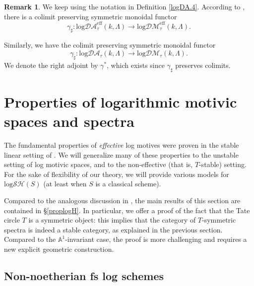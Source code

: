 \documentclass[11pt, a4paper]{amsart}
\theoremstyle{definition}
\newtheorem{rmk}[thm]{Remark}
\numberwithin{equation}{subsection}
\newcommand{\inflogSH}{\mathrm{log}\mathcal{SH}}
\newcommand{\inflogDA}{\mathrm{log}\mathcal{DA}}
\newcommand{\inflogDM}{\mathrm{log}\mathcal{DM}}
\begin{document}
\begin{rmk}
\label{logDA.5}
We keep using the notation in Definition \ref{logDA.4}.
According to \cite[\S 4.3]{logDM}, 
there is  a colimit preserving symmetric monoidal functor
\begin{equation}
\gamma_\sharp
\colon
\inflogDA_\tau^{\mathrm{eff}}(k,\Lambda)
\to
\inflogDM_\tau^{\mathrm{eff}}(k,\Lambda).
\end{equation}

Similarly, we have the colimit preserving symmetric monoidal functor
\begin{equation}
\label{logDA.5.2}
\gamma_\sharp
\colon
\inflogDA_\tau(k,\Lambda)
\to
\inflogDM_\tau(k,\Lambda).
\end{equation}
We denote the right adjoint by $\gamma^*$, 
which exists since $\gamma_\sharp$ preserves colimits.
\end{rmk}



\newpage





\section{Properties of logarithmic motivic spaces and spectra}
\label{polmsas}

The fundamental properties of \emph{effective} log motives were proven in the stable linear setting of \cite[\S 7]{logDM}.
We will generalize many of these properties to the unstable setting of log motivic spaces, and to the non-effective (that is, $T$-stable) setting. 
For the sake of flexibility of our theory, 
we will provide various models for $\inflogSH(S)$ (at least when $S$ is a classical scheme).

Compared to the analogous discussion in \cite{logDM}, the main results of this section are contained in \S \ref{proplogH}. In particular, we offer a proof of the fact that the Tate circle $T$ is a symmetric object: this implies that the category of $T$-symmetric spectra is indeed a stable category, as explained in the previous section. Compared to the $\mathbb{A}^1$-invariant case, the proof is more challenging and requires a new explicit geometric construction. 

\subsection{Non-noetherian fs log schemes}
\label{noetherian}
\end{document}
